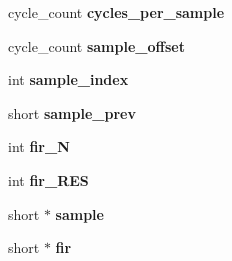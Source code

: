 \begin{DoxyCompactItemize}
\item 
\hypertarget{classSID2_adaee08f12a02ae0a4d6a73d5514b7edd}{cycle\-\_\-count {\bfseries cycles\-\_\-per\-\_\-sample}}\label{classSID2_adaee08f12a02ae0a4d6a73d5514b7edd}

\item 
\hypertarget{classSID2_ad4252ff863e533bb16512378fbef70e4}{cycle\-\_\-count {\bfseries sample\-\_\-offset}}\label{classSID2_ad4252ff863e533bb16512378fbef70e4}

\item 
\hypertarget{classSID2_af8364ec64e1628ef6f71678a5583b7a7}{int {\bfseries sample\-\_\-index}}\label{classSID2_af8364ec64e1628ef6f71678a5583b7a7}

\item 
\hypertarget{classSID2_acd8dbee876383f51664d18c5b6d411dd}{short {\bfseries sample\-\_\-prev}}\label{classSID2_acd8dbee876383f51664d18c5b6d411dd}

\item 
\hypertarget{classSID2_aa1209422391b4edad1396a9dff8cf0c3}{int {\bfseries fir\-\_\-\-N}}\label{classSID2_aa1209422391b4edad1396a9dff8cf0c3}

\item 
\hypertarget{classSID2_a1378d91adf9ee83a02462acc117f0d3a}{int {\bfseries fir\-\_\-\-R\-E\-S}}\label{classSID2_a1378d91adf9ee83a02462acc117f0d3a}

\item 
\hypertarget{classSID2_ab80ee788b3cfb79156fe629dff3cd1e8}{short $\ast$ {\bfseries sample}}\label{classSID2_ab80ee788b3cfb79156fe629dff3cd1e8}

\item 
\hypertarget{classSID2_a84d4ea8c045c7760f1798009fa835163}{short $\ast$ {\bfseries fir}}\label{classSID2_a84d4ea8c045c7760f1798009fa835163}

\end{DoxyCompactItemize}
